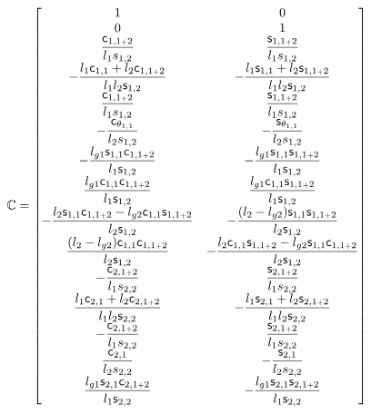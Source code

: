 \documentclass[a4paper,11pt,brazil,fleqn]{article}
\begin{document}
\begin{itemize}
\footnotesize\begin{equation}
\mathbb{C} =
\begin{bmatrix}
1 & 0 \\
0 & 1 \\
\displaystyle\frac{\mathsf{c}_{1,1{\scriptscriptstyle +} 2}}{l_1 s_{1,2}} & \displaystyle\frac{\mathsf{s}_{1,1{\scriptscriptstyle +} 2}}{l_1 s_{1,2}} \\
-\displaystyle\frac{l_1 \mathsf{c}_{1,1} + l_2 \mathsf{c}_{1,1{\scriptscriptstyle +} 2}}{l_1 l_2 \mathsf{s}_{1,2}} & -\displaystyle\frac{l_1 \mathsf{s}_{1,1} + l_2 \mathsf{s}_{1,1{\scriptscriptstyle +} 2}}{l_1 l_2 \mathsf{s}_{1,2}} \\
\displaystyle\frac{\mathsf{c}_{1,1{\scriptscriptstyle +} 2}}{l_1 s_{1,2}} & \displaystyle\frac{\mathsf{s}_{1,1{\scriptscriptstyle +} 2}}{l_1 s_{1,2}} \\
-\displaystyle\frac{\mathsf{c}_{\theta_{1,1}}}{l_2 s_{1,2}} & -\displaystyle\frac{\mathsf{s}_{\theta_{1,1}}}{l_2 s_{1,2}} \\
-\displaystyle\frac{l_{g1} \mathsf{s}_{1,1} \mathsf{c}_{1,1{\scriptscriptstyle +} 2}}{l_1 \mathsf{s}_{1,2}} & -\displaystyle\frac{l_{g1} \mathsf{s}_{1,1} \mathsf{s}_{1,1{\scriptscriptstyle +} 2}}{l_1 \mathsf{s}_{1,2}} \\
\displaystyle\frac{l_{g1} \mathsf{c}_{1,1} \mathsf{c}_{1,1{\scriptscriptstyle +} 2}}{l_1 \mathsf{s}_{1,2}} & \displaystyle\frac{l_{g1} \mathsf{c}_{1,1} \mathsf{s}_{1,1{\scriptscriptstyle +} 2}}{l_1 \mathsf{s}_{1,2}} \\
-\displaystyle\frac{l_2 \mathsf{s}_{1,1}\mathsf{c}_{1,1{\scriptscriptstyle +} 2} - l_{g2} \mathsf{c}_{1,1} \mathsf{s}_{1,1{\scriptscriptstyle +} 2} }{l_2 \mathsf{s}_{1,2}} & -\displaystyle\frac{(l_2 - l_{g2}) \mathsf{s}_{1,1}\mathsf{s}_{1,1{\scriptscriptstyle +} 2} }{l_2 \mathsf{s}_{1,2}} \\
\displaystyle\frac{(l_2 - l_{g2}) \mathsf{c}_{1,1}\mathsf{c}_{1,1{\scriptscriptstyle +} 2} }{l_2 \mathsf{s}_{1,2}} & -\displaystyle\frac{l_2 \mathsf{c}_{1,1}\mathsf{s}_{1,1{\scriptscriptstyle +} 2} - l_{g2} \mathsf{s}_{1,1} \mathsf{c}_{1,1{\scriptscriptstyle +} 2} }{l_2 \mathsf{s}_{1,2}} \\
-\displaystyle\frac{\mathsf{c}_{2,1{\scriptscriptstyle +} 2}}{l_1 s_{2,2}} & \displaystyle\frac{\mathsf{s}_{2,1{\scriptscriptstyle +} 2}}{l_1 s_{2,2}} \\
\displaystyle\frac{l_1 \mathsf{c}_{2,1} + l_2 \mathsf{c}_{2,1{\scriptscriptstyle +} 2}}{l_1 l_2 \mathsf{s}_{2,2}} & -\displaystyle\frac{l_1 \mathsf{s}_{2,1} + l_2 \mathsf{s}_{2,1{\scriptscriptstyle +} 2}}{l_1 l_2 \mathsf{s}_{2,2}} \\
-\displaystyle\frac{\mathsf{c}_{2,1{\scriptscriptstyle +} 2}}{l_1 s_{2,2}} & \displaystyle\frac{\mathsf{s}_{2,1{\scriptscriptstyle +} 2}}{l_1 s_{2,2}} \\
\displaystyle\frac{\mathsf{c}_{2,1}}{l_2 s_{2,2}} & -\displaystyle\frac{\mathsf{s}_{2,1}}{l_2 s_{2,2}} \\
\displaystyle\frac{l_{g1} \mathsf{s}_{2,1} \mathsf{c}_{2,1{\scriptscriptstyle +} 2}}{l_1 \mathsf{s}_{2,2}} & -\displaystyle\frac{l_{g1} \mathsf{s}_{2,1} \mathsf{s}_{2,1{\scriptscriptstyle +} 2}}{l_1 \mathsf{s}_{2,2}} \\

\end{bmatrix}
\end{equation}
\end{itemize}
\end{document}
